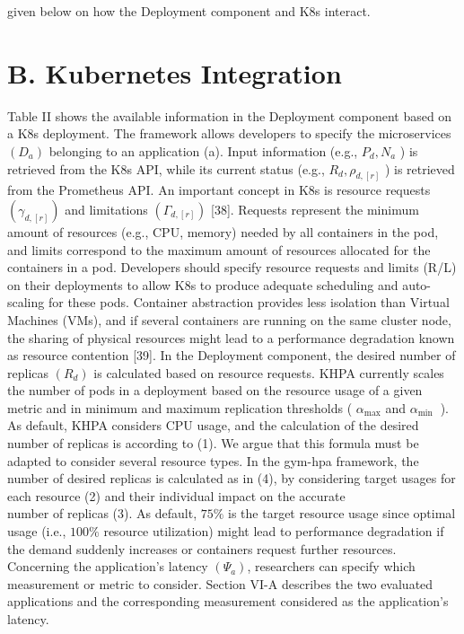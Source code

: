 \documentclass[10pt]{article}
\begin{document}
given below on how the Deployment component and K8s interact.

\section*{B. Kubernetes Integration}
Table II shows the available information in the Deployment component based on a K8s deployment. The framework allows developers to specify the microservices $\left(D_{a}\right)$ belonging to an application (a). Input information (e.g., $P_{d}, N_{a}$ ) is retrieved from the K8s API, while its current status (e.g., $R_{d}, \rho_{d,[r]}$ ) is retrieved from the Prometheus API. An important concept in K8s is resource requests $\left(\gamma_{d,[r]}\right)$ and limitations $\left(\Gamma_{d,[r]}\right)$ [38]. Requests represent the minimum amount of resources (e.g., CPU, memory) needed by all containers in the pod, and limits correspond to the maximum amount of resources allocated for the containers in a pod. Developers should specify resource requests and limits (R/L) on their deployments to allow K8s to produce adequate scheduling and auto-scaling for these pods. Container abstraction provides less isolation than Virtual Machines (VMs), and if several containers are running on the same cluster node, the sharing of physical resources might lead to a performance degradation known as resource contention [39]. In the Deployment component, the desired number of replicas $\left(R_{d}\right)$ is calculated based on resource requests. KHPA currently scales the number of pods in a deployment based on the resource usage of a given metric and in minimum and maximum replication thresholds ( $\alpha_{\max }$ and $\alpha_{\text {min }}$ ). As default, KHPA considers CPU usage, and the calculation of the desired number of replicas is according to (1). We argue that this formula must be adapted to consider several resource types. In the gym-hpa framework, the number of desired replicas is calculated as in (4), by considering target usages for each resource (2) and their individual impact on the accurate\\
number of replicas (3). As default, $75 \%$ is the target resource usage since optimal usage (i.e., $100 \%$ resource utilization) might lead to performance degradation if the demand suddenly increases or containers request further resources. Concerning the application's latency $\left(\Psi_{a}\right)$, researchers can specify which measurement or metric to consider. Section VI-A describes the two evaluated applications and the corresponding measurement considered as the application's latency.
\end{document}
